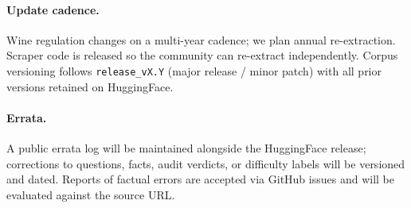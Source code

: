 \paragraph{Update cadence.}
Wine regulation changes on a multi-year cadence; we plan annual
re-extraction. Scraper code is released so the community can
re-extract independently. Corpus versioning follows
\texttt{release\_vX.Y} (major release / minor patch) with all prior
versions retained on HuggingFace.

\paragraph{Errata.}
A public errata log will be maintained alongside the HuggingFace
release; corrections to questions, facts, audit verdicts, or
difficulty labels will be versioned and dated. Reports of factual
errors are accepted via GitHub issues and will be evaluated against
the source URL.
